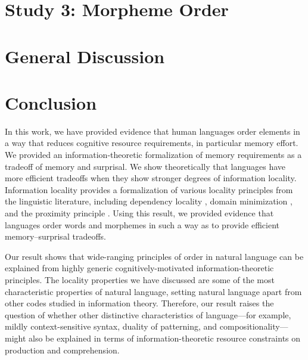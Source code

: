 \documentclass[man]{apa7}
\newcommand{\citep}{\parencite}
\begin{document}
\section{Study 3: Morpheme Order}\label{sec:morphemes}




\section{General Discussion}\label{sec:discussion}




\section{Conclusion}\label{sec:conclusion}

In this work, we have provided evidence that human languages order elements in a way that reduces cognitive resource requirements, in particular memory effort.
We provided an information-theoretic formalization of memory requirements as a tradeoff of memory and surprisal.
We show theoretically that languages have more efficient tradeoffs when they show stronger degrees of information locality.
Information locality provides a formalization of various locality principles from the linguistic literature, including dependency locality \citep{gibson1998linguistic}, domain minimization \citep{hawkins2004efficiency}, and the proximity principle \citep{givon1985iconicity}.
Using this result, we provided evidence that languages order words and morphemes in such a way as to provide efficient memory--surprisal tradeoffs.

Our result shows that wide-ranging principles of order in natural language can be explained from highly generic cognitively-motivated information-theoretic principles. The locality properties we have discussed are some of the most characteristic properties of natural language, setting natural language apart from other codes studied in information theory.
Therefore, our result raises the question of whether other distinctive characteristics of language---for example, mildly context-sensitive syntax, duality of patterning, and compositionality---might also be explained in terms of information-theoretic resource constraints on production and comprehension.






\printbibliography
\end{document}
